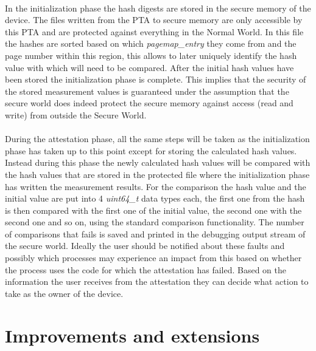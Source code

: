 \paragraph*{}%
In the initialization phase the hash digests are stored in the secure memory of the device. The files written from the PTA to secure memory are only accessible by this PTA and are protected against everything in the Normal World. In this file the hashes are sorted based on which \textit{pagemap\_entry} they come from and the page number within this region, this allows to later uniquely identify the hash value with which will need to be compared. After the initial hash values have been stored the initialization phase is complete. This implies that the security of the stored measurement values is guaranteed under the assumption that the secure world does indeed protect the secure memory against access (read and write) from outside the Secure World. 

\paragraph*{}%
During the attestation phase, all the same steps will be taken as the initialization phase has taken up to this point except for storing the calculated hash values. Instead during this phase the newly calculated hash values will be compared with the hash values that are stored in the protected file where the initialization phase has written the measurement results. For the comparison the hash value and the initial value are put into 4 \textit{uint64\_t} data types each, the first one from the hash is then compared with the first one of the initial value, the second one with the second one and so on, using the standard comparison functionality. The number of comparisons that fails is saved and printed in the debugging output stream of the secure world. Ideally the user should be notified about these faults and possibly which processes may experience an impact from this based on whether the process uses the code for which the attestation has failed. Based on the information the user receives from the attestation they can decide what action to take as the owner of the device.

\section{Improvements and extensions}

